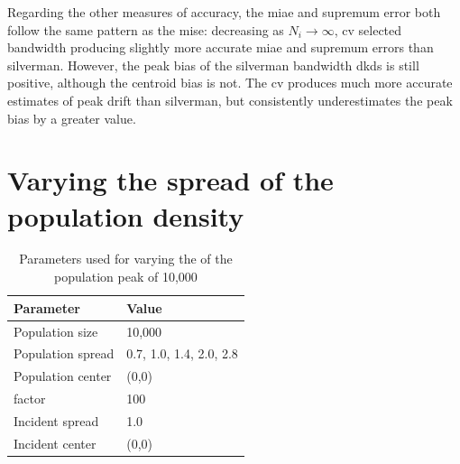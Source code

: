

Regarding the other measures of accuracy, the \gls{miae} and \gls{supremum error} both follow the same pattern as the \gls{mise}:
decreasing as $N_i \to \infty$,
\gls{cv} selected bandwidth producing slightly more accurate \gls{miae} and \glspl{supremum error} than \gls{silverman}.
However, the \gls{peak bias} of the \gls{silverman} bandwidth \glspl{dkd} is still positive, although the \gls{centroid bias} is not.
The \gls{cv} produces much more accurate estimates of \gls{peak drift} than \gls{silverman}, but consistently underestimates the \gls{peak bias} by a greater value.

\section{Varying the spread of the population density}
\label{sec:results:pSD_100_1h}

\begin{table}[htbp]
    \centering
    \begin{tabular}{ll}
        \toprule
        Parameter & Value \\
        \midrule
        Population size & 10,000 \\
        Population \gls{spread} & 0.7, 1.0, 1.4, 2.0, 2.8 \\
        Population center & (0,0) \\
        \Gls{factor} & 100 \\
        Incident \gls{spread} & 1.0 \\
        Incident center & (0,0) \\
        \bottomrule
    \end{tabular}
    \caption{Parameters used for varying the  of the population peak of 10,000}
    \label{tab:params:pSD_100_1h}
\end{table}

